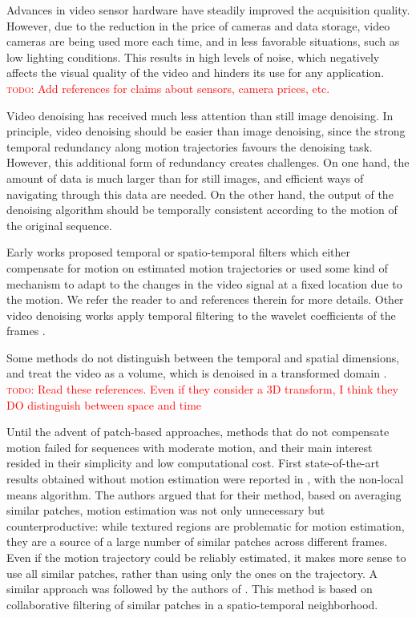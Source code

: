 \documentclass[10pt, journal, twocolumn, final, a4paper]{IEEEtran}
\newcommand{\todo}[1]{\textcolor{red}{\noindent\textsc{todo}: #1}}
\begin{document}
Advances in video sensor hardware have steadily improved the acquisition
quality. However, due to the reduction in the price of cameras
and data storage, video cameras are being used more each time, and in less
favorable situations, such as low lighting conditions. This results in high 
levels of noise, which negatively affects the visual quality of the video and
hinders its use for any application. 
\todo{Add references for claims about sensors, camera prices, etc.}

Video denoising has received much less attention than still image denoising. 
In principle, video denoising should be easier than image denoising, since the
strong temporal redundancy along motion trajectories favours the denoising
task. However, this additional form of redundancy creates challenges.  On one
hand, the amount of data is much larger than for still images, and efficient
ways of navigating through this data are needed. On the other hand, the output
of the denoising algorithm should be temporally consistent according to the
motion of the original sequence.

Early works proposed temporal or spatio-temporal filters which either compensate
for motion on estimated motion trajectories or used some kind of mechanism to
adapt to the changes in the video signal at a fixed location due to the motion.
We refer the reader to \cite{Brailean1995a} and references therein for more details.
Other video denoising works apply temporal filtering to the wavelet coefficients 
of the frames \cite{Jin2006,Zlokolica2006a}. 

Some methods do not distinguish between the temporal and spatial dimensions,
and treat the video as a volume, which is denoised in a transformed domain
\cite{Rajpoot2003,Wilson2004,Selesnick2003}. 
\todo{Read these references. Even if they consider a 3D transform, I think
they DO distinguish between space and time}

Until the advent of patch-based approaches, methods that do not compensate
motion failed for sequences with moderate motion, and their main interest resided
in their simplicity and low computational cost. First state-of-the-art results
obtained without motion estimation were reported in \cite{Buades2005v}, with the
non-local means algorithm. The authors argued that for their method, based on
averaging similar patches, motion estimation was not only unnecessary but
counterproductive: while textured regions are problematic for motion
estimation, they are a source of a large number of similar patches across
different frames. Even if the motion trajectory could be reliably estimated, it
makes more sense to use all similar patches, rather than using only the ones on the
trajectory.
%
A similar approach was followed by the authors of \cite{Dabov2007v}. This method is based
on collaborative filtering of similar patches in a
spatio-temporal neighborhood. 
\end{document}
